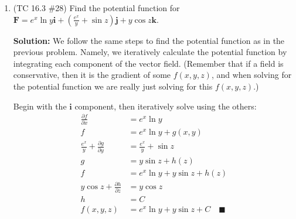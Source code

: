 \documentclass[letterpaper, 11pt]{article}
\begin{document}
\begin{enumerate}
\item (TC 16.3 \#28) Find the potential function for $\bm{F} = e^x \ln y \bm{i} + \left( \frac{ e^x}{y} + \sin z\right) \bm{j} + y\cos z \bm{k}$. 

\par \textbf{Solution:} We follow the same steps to find the potential function as in the previous problem. Namely, we iteratively calculate the potential function by integrating each component of the vector field. (Remember that if a field is conservative, then it is the gradient of some $f(x,y,z)$, and when solving for the potential function we are really just solving for this $f(x,y,z)$.) 
\par Begin with the $\bm{i}$ component, then iteratively solve using the others:
\begin{align*}
\frac{\partial f}{\partial x} &= e^x \ln y \\
f &= e^x \ln y + g(x,y) \\
\frac{e^x}{y} + \frac{\partial g}{\partial y} &= \frac{ e^x}{y} + \sin z \\
g &= y \sin z + h(z)\\
f&= e^x \ln y +  y \sin z + h(z)\\
y \cos z + \frac{\partial h}{\partial z} &= y \cos z \\
h &= C \\
f(x,y,z) &= e^x \ln y +  y \sin z + C \quad\blacksquare
\end{align*}

\end{enumerate}
\end{document}
